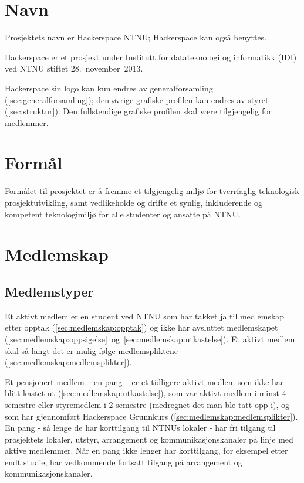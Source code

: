 \section{Navn}\label{sec:navn}
Prosjektets navn er Hackerspace NTNU; Hackerspace kan også benyttes.

Hackerspace er et prosjekt under Institutt for datateknologi og informatikk (IDI) ved NTNU stiftet 28.~november~2013.

Hackerspace sin logo kan kun endres av generalforsamling (\ref{sec:generalforsamling}); den øvrige grafiske profilen kan endres av styret (\ref{sec:struktur}). Den fullstendige grafiske profilen skal være tilgjengelig for medlemmer.


\section{Formål}\label{sec:formål}
Formålet til prosjektet er å fremme et tilgjengelig miljø for tverrfaglig teknologisk prosjektutvikling, samt vedlikeholde og drifte et synlig, inkluderende og kompetent teknologimiljø for alle studenter og ansatte på NTNU.\@


\section{Medlemskap}\label{sec:medlemskap}
\subsection{Medlemstyper}\label{sec:medlemskap:medlemstyper}
Et aktivt medlem er en student ved NTNU som har takket ja til medlemskap etter opptak (\ref{sec:medlemskap:opptak}) og ikke har avsluttet medlemskapet (\ref{sec:medlemskap:oppsigelse}~og~\ref{sec:medlemskap:utkastelse}).
Et aktivt medlem skal så langt det er mulig følge medlemspliktene (\ref{sec:medlemskap:medlemsplikter}).

Et pensjonert medlem -- en pang -- er et tidligere aktivt medlem som ikke har blitt kastet ut (\ref{sec:medlemskap:utkastelse}), som var aktivt medlem i minst 4 semestre eller styremedlem i 2 semestre (medregnet det man ble tatt opp i), og som har gjennomført Hackerspace Grunnkurs (\ref{sec:medlemskap:medlemsplikter}).
En pang - så lenge de har korttilgang til NTNUs lokaler - har fri tilgang til prosjektets lokaler, utstyr, arrangement og kommunikasjonskanaler på linje med aktive medlemmer.
Når en pang ikke lenger har korttilgang, for eksempel etter endt studie, har vedkommende fortsatt tilgang på arrangement og kommunikasjonskanaler.

